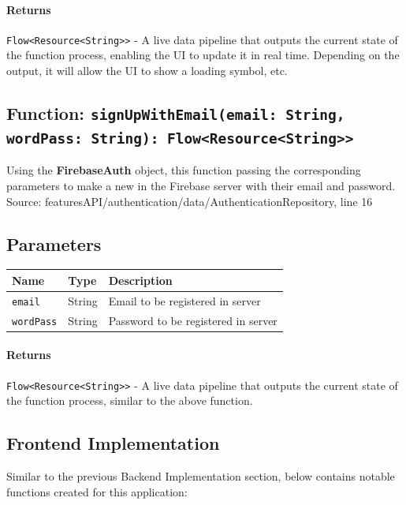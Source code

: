 \documentclass{article}
\begin{document}
                \paragraph{Returns} \texttt{Flow<Resource<String>>} - A live data pipeline that outputs
                the current state of the function process, enabling the UI to update it in real time.
                Depending on the output, it will allow the UI to show a loading symbol, etc.

            \hrulefill

            \subsection*{Function: \texttt{signUpWithEmail(email: String, wordPass: String): Flow<Resource<String>>}}

                Using the \textbf{FirebaseAuth} object, this function passing the 
                corresponding parameters to make a new in the Firebase server
                with their email and password. \\
                Source: featuresAPI/authentication/data/AuthenticationRepository, line 16
                
                \subsection*{Parameters}

                \begin{tabular}{p{3cm} p{4cm} p{7cm}}
                \toprule
                \textbf{Name} & \textbf{Type} & \textbf{Description} \\ \midrule
                \texttt{email} & String & Email to be registered in server \\ \addlinespace
                \texttt{wordPass} & String & Password to be registered in server \\ \bottomrule
                \end{tabular}

                \paragraph{Returns} \texttt{Flow<Resource<String>>} - A live data pipeline that outputs
                the current state of the function process, similar to the above function.

            \newpage

        \subsection{Frontend Implementation} Similar to the previous Backend Implementation section, 
        below contains notable functions created for this application:
\end{document}
